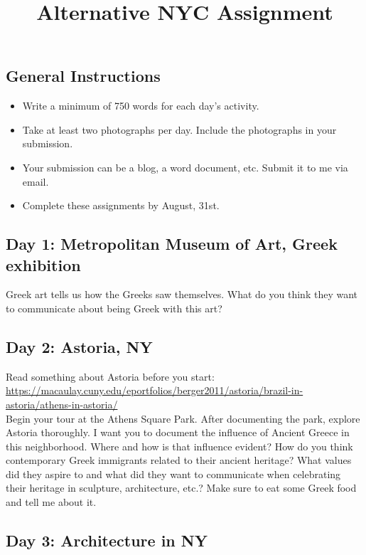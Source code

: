 \documentclass{article}
\title{Alternative NYC Assignment}
\begin{document}
\maketitle

\subsection*{General Instructions}
\begin{itemize}
\item  Write  a minimum of 750 words for each day's activity. 
\item Take at least two photographs per day. Include the photographs in your submission. 
\item Your submission can be a blog, a word document, etc. Submit it to me via email. 
\item Complete these assignments by August, 31st. 
\end{itemize}

\subsection*{Day 1: Metropolitan  Museum  of  Art,  Greek  exhibition}
Greek  art  tells  us  how  the  Greeks  saw  themselves.  What  do  you  think  they  want  to  communicate  about  being  Greek  with  this  art?  

\subsection*{Day  2: Astoria,  NY}
Read  something  about  Astoria before you start: \url{https://macaulay.cuny.edu/eportfolios/berger2011/astoria/brazil-in-astoria/athens-in-astoria/}\\

Begin your tour at the Athens  Square  Park.  After documenting  the  park, explore Astoria thoroughly. I  want  you  to  document  the  influence  of  Ancient  Greece  in  this  neighborhood.  Where  and  how  is  that  influence  evident?  How  do  you  think  contemporary  Greek  immigrants  related  to  their  ancient  heritage?  What  values  did  they  aspire  to  and  what  did  they  want  to  communicate  when  celebrating  their  heritage  in  sculpture,  architecture,  etc.?  Make  sure  to  eat  some  Greek  food  and  tell  me  about  it.    



\subsection*{Day  3:  Architecture in NY}
\end{document}
